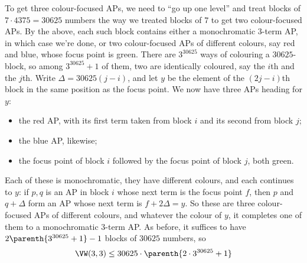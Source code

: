 To get three colour-focused APs, we need to ``go up one level'' and treat blocks of $7 \cdot 4375 = 30625$ numbers the way we treated blocks of $7$ to get two colour-focused APs. By the above, each such block contains either a monochromatic $3$-term AP, in which case we're done, or two colour-focused APs of different colours, say red and blue, whose focus point is green. There are $3^{30625}$ ways of colouring a $30625$-block, so among $3^{30625} + 1$ of them, two are identically coloured, say the $i$th and the $j$th. Write $\Delta = 30625(j - i)$, and let $y$ be the element of the $(2j - i)$th block in the same position as the focus point. We now have three APs heading for $y$:
\begin{itemize}
    \item the red AP, with its first term taken from block $i$ and its second from block $j$;
    \item the blue AP, likewise;
    \item the focus point of block $i$ followed by the focus point of block $j$, both green.
\end{itemize}

\begin{figure}[H] %
    \centering
\end{figure}

Each of these is monochromatic, they have different colours, and each continues to $y$: if $p, q$ is an AP in block $i$ whose next term is the focus point $f$, then $p$ and $q + \Delta$ form an AP whose next term is $f + 2\Delta = y$. So these are three colour-focused APs of different colours, and whatever the colour of $y$, it completes one of them to a monochromatic $3$-term AP. As before, it suffices to have $2\parenth{3^{30625} + 1} - 1$ blocks of $30625$ numbers, so
\begin{align*}
    \VW(3, 3) \leq 30625 \cdot \parenth{2 \cdot 3^{30625} + 1}
\end{align*}

